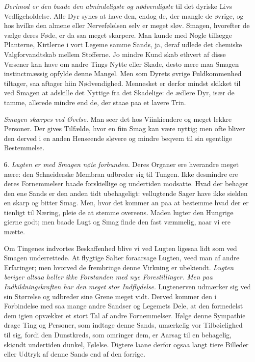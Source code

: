 \documentclass[12pt,a4paper]{article}
\newcommand{\opage}[1]{\marginnote{\footnotesize\textit{[#1]}}}
\begin{document}
\emph{Derimod er den baade den almindeligste og nødvendigste} til det dyriske Livs
Vedligeholdelse. Alle Dyr synes at have den, endog de, der mangle de øvrige, og hos
hvilke den almene eller Nervefølelsen selv er meget sløv. Smagen, hvorefter de vælge
deres Føde, er da saa meget skarpere. Man kunde med Nogle tillægge Planterne,
Kirtlerne i vort Legeme samme Sands, ja, deraf udlede det chemiske Valgforvandtskab
mellem Stofferne. Jo mindre Kund%
\opage{66}skab ethvert af disse Væsener kan have om andre Tings Nytte eller Skade, desto mere
maa Smagen instinctmæssig opfylde denne Mangel. Men som Dyrets øvrige Fuldkommenhed
tiltager, saa aftager hiin Nødvendighed. Mennesket er derfor mindst skikket til ved
Smagen at adskille det Nyttige fra det Skadelige: de ædlere Dyr, især de tamme,
allerede mindre end de, der staae paa et lavere Trin.

\emph{Smagen skærpes ved Øvelse.} Man seer det hos Viinkiendere og meget lekkre
Personer. Der gives Tilfælde, hvor en fiin Smag kan være nyttig; men ofte bliver den
derved i en anden Henseende sløvere og mindre beqvem til sin egentlige Bestemmelse.

6. \emph{Lugten er med Smagen nøie forbunden.} Deres Organer ere hverandre meget nære:
den Schneiderske Membran udbreder sig til Tungen. Ikke desmindre ere deres
Fornemmelser baade forskiellige og undertiden modsatte. Hvad der behager den ene Sands
er den anden tidt ubehageligt: vellugtende Sager have ikke sielden en skarp og bitter
Smag. Men, hvor det kommer an paa at bestemme hvad der er tienligt til Næring, pleie
de at stemme overeens. Maden lugter den Hungrige gierne godt; men baade Lugt og Smag
finde den fast væmmelig, naar vi ere mætte.

Om Tingenes indvortes Beskaffenhed blive vi ved Lugten ligesaa lidt som ved Smagen
underrettede. At flygtige Salter foraarsage Lugten, veed man af andre
\opage{67} Erfaringer; men hvorved de frembringe denne Virkning er ubekiendt. \emph{Lugten
beriger altsaa heller ikke Forstanden med nye Forestillinger. Men paa
Indbildningskraften har den meget stor Indflydelse.} Lugtenerven udmærker sig ved sin
Størrelse og udbreder sine Grene meget vidt. Derved kommer den i Forbindelse med saa
mange andre Sandser og Legemets Dele, at den formedelst dem igien opvækker et stort Tal
af andre Fornemmelser. Ifølge denne Sympathie drage Ting og Personer, som indtage denne
Sands, umærkelig vor Tilbøielighed til sig, fordi den Dunstkreds, som omringer dem, er
Aarsag til en behagelig, skiøndt undertiden dunkel, Følelse. Digtere laane derfor ogsaa
langt tiere Billeder eller Udtryk af denne Sands end af den forrige.
\end{document}
